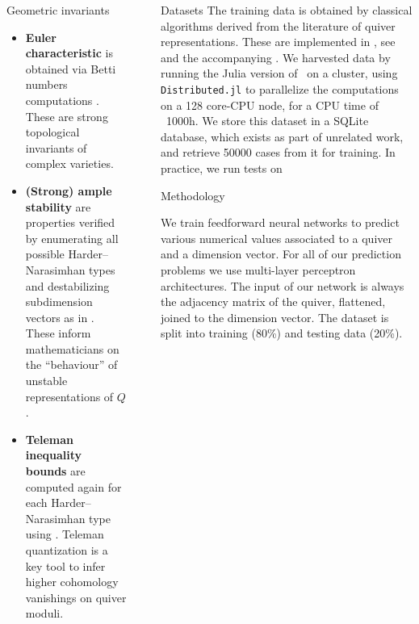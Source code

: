 \documentclass[final,20pt]{beamer}
\newlength{\sepwidth}
\newlength{\colwidth}
\newcommand{\separatorcolumn}{\begin{column}{\sepwidth}\end{column}}
\begin{document}
\begin{frame}[t]
\begin{columns}[t]
\begin{column}{\colwidth}
\begin{alertblock}{Geometric invariants}
    \begin{itemize}
      \item \textbf{Euler characteristic} is obtained via Betti numbers computations \cite{MR1974891}.
      These are strong topological invariants of complex varieties.

      \item \textbf{(Strong) ample stability} are properties verified by enumerating
      all possible Harder--Narasimhan types and destabilizing subdimension vectors as in \cite{MR1974891,2311.17003}.
      These inform mathematicians on the ``behaviour'' of unstable representations
      of $Q$.

      \item \textbf{Teleman inequality bounds} are computed again
      for each Harder--Narasimhan type using \cite{2311.17003}.
      Teleman quantization is a key tool to infer higher cohomology vanishings
      on quiver moduli.
    \end{itemize}

  \end{alertblock}

\end{column}

\separatorcolumn

\begin{column}{\colwidth}



  \begin{block}{Datasets}
    The training data is obtained by classical algorithms derived from
    the literature of quiver representations. These are implemented in
    \quivertools, see \cite{quivertools} and the accompanying \cite{2506.19432}.
    We harvested data by running the Julia version of \quivertools~on a cluster,
    using {\tt{Distributed.jl}} to parallelize the computations on a 128 core-CPU node,
    for a CPU time of ~1000h.
    We store this dataset in a SQLite database, which exists
    as part of unrelated work, and retrieve 50000 cases from it
    for training.
    In practice, we run tests on 

  \end{block}

  \begin{block}{Methodology}

    We train feedforward neural networks to predict various numerical values
    associated to a quiver and a dimension vector.
    For all of our prediction problems we use multi-layer perceptron architectures.
    The input of our network is always the adjacency matrix of the quiver, flattened,
    joined to the dimension vector.
    The dataset is split into training (80\%) and testing data (20\%).


\end{block}
\end{column}
\end{columns}
\end{frame}
\end{document}
